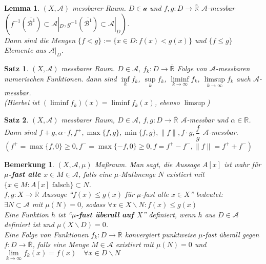 \documentclass[11pt]{memoir}
\theoremstyle{changebreak}
\newtheorem{Bemerkung}{Bemerkung}[chapter]
\newtheorem{Lemma}{Lemma}[chapter]
\newtheorem{Satz}{Satz}[chapter]
\newcommand{\quotes}[1]{``#1''}
\begin{document}
\begin{Lemma}
$(X, \mathscr A)$ messbarer Raum. $D \in \mathscr a$ und $f, g: D \rightarrow \overline{\mathbb R }$ $\mathscr A$-messbar \\
$ \left( f^{-1}(\overline{\mathscr{B}^1}) \subset \mathscr A |_D, g^{-1}(\overline{\mathscr{B}^1}) \subset \mathscr A |_D\right)$. \\ Dann sind die Mengen $\{f < g\}:= \{x \in D: f(x) < g(x)\}$ und $\{f \leq g\}$ Elemente aus $\mathscr A |_D$.
\end{Lemma}

\begin{Satz}
$(X, \mathscr A)$ messbarer Raum. $D \in \mathscr A$, $f_k: D \rightarrow \overline{\mathbb R}$ Folge von $\mathscr A$-messbaren numerischen Funktionen. dann sind $\inf\limits_k f_k$, $\sup\limits_k f_k$, $\liminf\limits_{k\rightarrow \infty} f_k$, $\limsup\limits_{k \rightarrow \infty} f_k$ auch $\mathscr A$-messbar. \\
(Hierbei ist $(\liminf f_k)(x) = \liminf f_k(x)$, ebenso $\limsup$)
\end{Satz}

\begin{Satz}
$(X, \mathscr A)$ messbarer Raum, $D \in \mathscr A$, $f, g: D \rightarrow \overline{\mathbb R }$ $\mathscr A$-messbar und $\alpha \in \mathbb R$. Dann sind $f+g, \alpha \cdotp f, f^\pm, \max{\{f, g\}}, \min{\{f, g\}}, \|f\|, f \cdotp g, \dfrac{f}{g}$ $\mathscr A$-messbar. \\
$\left( f^+ = \max{\{f, 0\}} \geq 0, f^- = \max{\{-f, 0\}} \geq 0, f = f^+ - f^-, \|f\| = f^+ + f^- \right)$
\end{Satz}

\begin{Bemerkung}
$(X, \mathscr A, \mu)$ Maßraum. Man sagt, die Aussage $A[x]$ ist wahr für \textbf{$\mu$-fast alle $x \in M \in \mathscr A$}, falls eine $\mu$-Mullmenge $N$ existiert mit $\{x \in M: A[x]  \text{ falsch}\} \subset N$.\\
$f, g: X \rightarrow \overline{\mathbb R}$ Aussage  \quotes{$f(x) \leq g(x)$ für $\mu$-fast alle $x \in X$}  bedeutet: \\
$\exists N \subset \mathscr A$ mit $\mu(N) = 0$, sodass $\forall x \in X\backslash N: f(x) \leq g(x)$ \\
Eine Funktion $h$ ist \quotes{\textbf{$\mu$-fast überall auf $X$}} definiert, wenn $h$ aus $D \in \mathscr A$ definiert ist und $\mu(X \backslash D) = 0$. \\
Eine Folge von Funktionen $f_k: D \rightarrow \overline{\mathbb R}$ konvergiert punktweise $\mu$-fast überall gegen $f: D \rightarrow \overline{\mathbb R}$, falls eine Menge $M \in \mathscr A$ existiert mit $\mu(N) = 0$ und $\lim\limits_ {k \rightarrow \infty} f_k(x) = f(x)\quad \forall x \in D \backslash N$
\end{Bemerkung}
\end{document}
